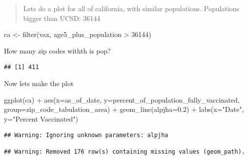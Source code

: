 \documentclass[
]{article}
\newenvironment{Shaded}{\begin{snugshade}}{\end{snugshade}}
\newcommand{\AttributeTok}[1]{\textcolor[rgb]{0.77,0.63,0.00}{#1}}
\newcommand{\DecValTok}[1]{\textcolor[rgb]{0.00,0.00,0.81}{#1}}
\newcommand{\FloatTok}[1]{\textcolor[rgb]{0.00,0.00,0.81}{#1}}
\newcommand{\FunctionTok}[1]{\textcolor[rgb]{0.00,0.00,0.00}{#1}}
\newcommand{\NormalTok}[1]{#1}
\newcommand{\OtherTok}[1]{\textcolor[rgb]{0.56,0.35,0.01}{#1}}
\newcommand{\SpecialCharTok}[1]{\textcolor[rgb]{0.00,0.00,0.00}{#1}}
\newcommand{\StringTok}[1]{\textcolor[rgb]{0.31,0.60,0.02}{#1}}
\begin{document}
\begin{quote}
Lets do a plot for all of california, with similar populations.
Populations bigger than UCSD: 36144
\end{quote}

\begin{Shaded}
\begin{Highlighting}[]
\NormalTok{ca }\OtherTok{\textless{}{-}} \FunctionTok{filter}\NormalTok{(vax, age5\_plus\_population }\SpecialCharTok{\textgreater{}} \DecValTok{36144}\NormalTok{)}
\end{Highlighting}
\end{Shaded}

How many zip codes withth is pop?

\begin{Shaded}
\end{Shaded}

\begin{verbatim}
## [1] 411
\end{verbatim}

Now lets make the plot

\begin{Shaded}
\begin{Highlighting}[]
\FunctionTok{ggplot}\NormalTok{(ca) }\SpecialCharTok{+} 
  \FunctionTok{aes}\NormalTok{(}\AttributeTok{x=}\NormalTok{as\_of\_date, }\AttributeTok{y=}\NormalTok{percent\_of\_population\_fully\_vaccinated, }
      \AttributeTok{group=}\NormalTok{zip\_code\_tabulation\_area) }\SpecialCharTok{+}
  \FunctionTok{geom\_line}\NormalTok{(}\AttributeTok{alpjha=}\FloatTok{0.2}\NormalTok{) }\SpecialCharTok{+}
  \FunctionTok{labs}\NormalTok{(}\AttributeTok{x=}\StringTok{"Date"}\NormalTok{, }\AttributeTok{y=}\StringTok{"Percent Vaccinated"}\NormalTok{)}
\end{Highlighting}
\end{Shaded}

\begin{verbatim}
## Warning: Ignoring unknown parameters: alpjha
\end{verbatim}

\begin{verbatim}
## Warning: Removed 176 row(s) containing missing values (geom_path).
\end{verbatim}
\end{document}
